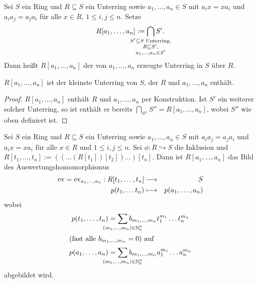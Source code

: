 \documentclass[12pt,a4paper]{scrartcl}
\begin{document}
\begin{defi}
	Sei $S$ ein Ring und $R\subseteq S$ ein Unterring sowie $a_1,\dots,a_n\in S$ mit $a_ix = xa_i$ und $a_ia_j = a_ja_i$ für alle $x\in R$, $1\leq i,j\leq n$. Setze
	\[ R[a_1,\dots,a_n] := \bigcap_{\mathclap{\substack{S'\subseteq S \text{ Unterring},\\R\subseteq S',\\ a_1,\dots,a_n\in S'}}}S'.\]
	Dann heißt $R[a_1,\dots,a_n]$ der von $a_1,\dots,a_n$ erzeugte Unterring in $S$ über $R$. 
\end{defi}


\begin{bem}
	$R[a_1,\dots,a_n]$ ist der kleinste Unterring von $S$, der $R$ und $a_1,\dots,a_n$ enthält.
\end{bem}
\begin{proof}
	$R[a_1,\dots,a_n]$ enthält $R$ und $a_1,\dots,a_n$ per Konstruktion.
	Ist $S'$ ein weiterer solcher Unterring, so ist enthält er bereits $\bigcap_{S''}S'' = R[a_1,\dots,a_n]$, wobei $S''$ wie oben definiert ist.
\end{proof}

\begin{satz}\label{thm:evalpolyring}
	Sei $S$ ein Ring und $R\subseteq S$ ein Unterring sowie $a_1,\dots,a_n\in S$ mit $a_ia_j = a_ja_i$ und $a_ix = xa_i$ für alle $x\in R$ und $1\leq i,j\leq n$. Sei $\phi \colon R\hookrightarrow S$ die Inklusion und $R[t_1,\dots, t_n] := ((\dots(R[t_1])[t_2])\dots)[t_n]$. Dann ist $R[a_1,\dots,a_n]$ das Bild des Auswertungshomomorphismus 
	\begin{eqnarray*}
		\operatorname{ev} = \operatorname{ev}_{a_1,\dots,a_n}: R[t_1,\dots,t_n] & \longrightarrow & S\\
		p(t_1,\dots t_n) & \longmapsto & p(a_1, \dots, a_n)
	\end{eqnarray*}
	wobei
	\begin{align*}
		p (t_1,\dots, t_n) &= \sum_{\mathclap{(m_1,\dots,m_n)\in\IN_{0}^n}}b_{m_1,\dots,m_n} t_1^{m_1} \dots t_n^{m_n} \\
		\intertext{(fast alle $b_{m_1,\dots,m_n} = 0$) auf}
		p(a_1,\dots, a_n ) &= \sum_{\mathclap{(m_1,\dots, m_n)\in \IN_0^n}} b_{m_1,\dots,m_n} a_1^{m_1}\dots a_n^{m_n}
	\end{align*}
	abgebildet wird.
\end{satz}
\end{document}
